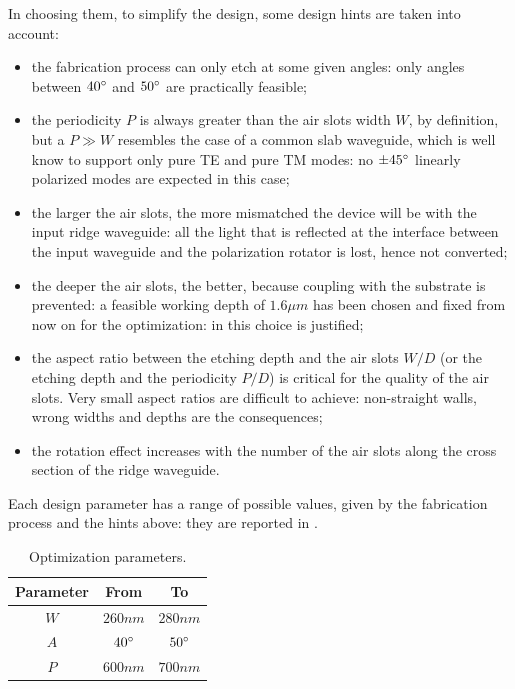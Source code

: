 In choosing them, to simplify the design, some design hints are taken
into account:
\begin{itemize}
\item
  the fabrication process can only etch at some given angles: only
  angles between $40^\circ$ and $50^\circ$ are practically
  feasible;
\item
  the periodicity $P$ is always greater than the air slots width $W$,
  by definition, but a $P \gg W$ resembles the case of a common slab
  waveguide, which is well know to support only pure TE and pure TM
  modes: no $\pm45^\circ$ linearly polarized modes are expected in
  this case;
\item
  the larger the air slots, the more mismatched the device will be
  with the input ridge waveguide: all the light that is reflected at
  the interface between the input waveguide and the polarization
  rotator is lost, hence not converted;
\item
  the deeper the air slots, the better, because coupling with the
  substrate is prevented: a feasible working depth of $1.6 \mu m$ has
  been chosen and fixed from now on for the optimization: in
   this choice is justified;
\item
  the aspect ratio between the etching depth and the air slots $W/D$
  (or the etching depth and the periodicity $P/D$) is critical for the
  quality of the air slots. Very small aspect ratios are difficult to
  achieve: non-straight walls, wrong widths and depths are the
  consequences;
\item
  the rotation effect increases with the number of the air slots along
  the cross section of the ridge waveguide.
\end{itemize}

Each design parameter has a range of possible values, given by the
fabrication process and the hints above: they are reported in
. 

\begin{table}[htbp]
  \begin{center}
    \begin{tabular}{ccc}
      \hline
      Parameter & From & To \\
      \hline
      $W$ & $260 nm$ & $280 nm$ \\
      $A$ & $40 ^\circ$ & $50 ^\circ$ \\
      $P$ & $600 nm$ & $700 nm$ \\      
      \hline
    \end{tabular}
  \end{center}
  \caption{Optimization parameters.}
  \label{tab:polrot_parameters}
\end{table}

